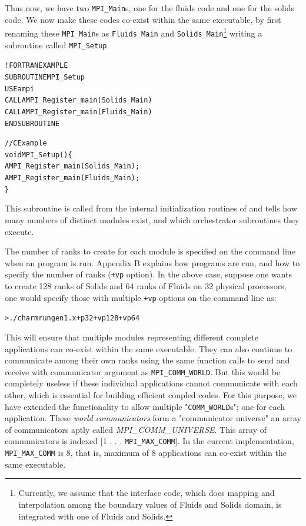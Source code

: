 \documentclass[10pt]{article}
\begin{document}
Thus now, we have two \texttt{MPI\_Main}s, one for the fluids code and one for
the solids code. We now make these codes co-exist within the same executable,
by first renaming these \texttt{MPI\_Main}s as \texttt{Fluids\_Main} and
\texttt{Solids\_Main}\footnote{Currently, we assume that the interface code,
which does mapping and interpolation among the boundary values of Fluids and
Solids domain, is integrated with one of Fluids and Solids.} writing a
subroutine called \texttt{MPI\_Setup}.

\begin{alltt}
!FORTRAN EXAMPLE
SUBROUTINE MPI_Setup
  USE ampi
  CALL AMPI_Register_main(Solids_Main)
  CALL AMPI_Register_main(Fluids_Main)
END SUBROUTINE

//C Example
void MPI_Setup()\{
  AMPI_Register_main(Solids_Main);
  AMPI_Register_main(Fluids_Main);
\}
\end{alltt}

This subroutine is called from the internal initialization routines of \ampi{}
and tells \ampi{} how many numbers of distinct modules exist, and
which orchestrator subroutines they execute.

The number of ranks to create for each module is specified on the command
line when an \ampi{} program is run. Appendix B explains how \ampi{} programs
are run, and how to specify the number of ranks (\verb|+vp| option). In the
above case, suppose one wants to create 128 ranks of Solids and 64 ranks of
Fluids on 32 physical processors, one would specify those with multiple
\verb|+vp| options on the command line as:

\begin{alltt}
> ./charmrun gen1.x +p 32 +vp 128 +vp 64
\end{alltt}

This will ensure that multiple modules representing different complete
applications can co-exist within the same executable. They can also continue to
communicate among their own ranks using the same \ampi{} function calls
to send and receive with communicator argument as \texttt{MPI\_COMM\_WORLD}.
But this would be completely useless if these individual applications cannot
communicate with each other, which is essential for building efficient coupled
codes.  For this purpose, we have extended the \ampi{} functionality to allow
multiple "\texttt{COMM\_WORLD}s"; one for each application. These \emph{world
communicators} form a "communicator universe" an array of communicators
aptly called \emph{MPI\_COMM\_UNIVERSE}. This array of communicators is 
indexed [1 . . . \texttt{MPI\_MAX\_COMM}]. In the current implementation,
\texttt{MPI\_MAX\_COMM} is 8, that is, maximum of 8 applications can co-exist
within the same executable.
\end{document}

